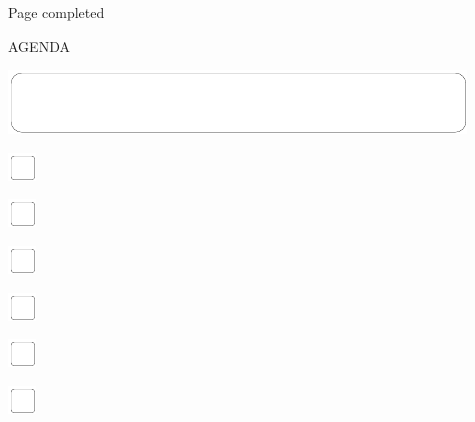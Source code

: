 \documentclass[11pt,titlepage]{article}
\begin{document}
\hfill Page completed \hspace{20mm}

\pagebreak

\small %
\hfill AGENDA

\vspace{6mm}

\noindent
\includegraphics[]{mediumbox.pdf}

\vspace{15mm}

\noindent
\includegraphics[]{checkbox-4mm.pdf}

\vspace{10mm}

\noindent
\includegraphics[]{checkbox-4mm.pdf}

\vspace{10mm}

\noindent
\includegraphics[]{checkbox-4mm.pdf}

\vspace{10mm}

\noindent
\includegraphics[]{checkbox-4mm.pdf}

\vspace{10mm}

\noindent
\includegraphics[]{checkbox-4mm.pdf}

\vspace{10mm}

\noindent
\includegraphics[]{checkbox-4mm.pdf}
\end{document}
